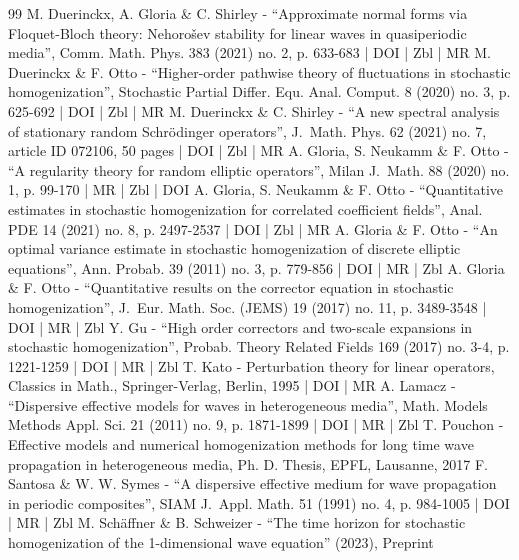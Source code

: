 \begin{thebibliography}{99}
M. Duerinckx, A. Gloria \& C. Shirley - “Approximate normal forms via Floquet-Bloch theory: Nehorošev stability for linear waves in quasiperiodic media”, Comm. Math. Phys. 383 (2021) no. 2, p. 633-683 | DOI | Zbl | MR
M. Duerinckx \& F. Otto - “Higher-order pathwise theory of fluctuations in stochastic homogenization”, Stochastic Partial Differ. Equ. Anal. Comput. 8 (2020) no. 3, p. 625-692 | DOI | Zbl | MR
M. Duerinckx \& C. Shirley - “A new spectral analysis of stationary random Schrödinger operators”, J. Math. Phys. 62 (2021) no. 7, article ID 072106, 50 pages | DOI | Zbl | MR
A. Gloria, S. Neukamm \& F. Otto - “A regularity theory for random elliptic operators”, Milan J. Math. 88 (2020) no. 1, p. 99-170 | MR | Zbl | DOI
A. Gloria, S. Neukamm \& F. Otto - “Quantitative estimates in stochastic homogenization for correlated coefficient fields”, Anal. PDE 14 (2021) no. 8, p. 2497-2537 | DOI | Zbl | MR
A. Gloria \& F. Otto - “An optimal variance estimate in stochastic homogenization of discrete elliptic equations”, Ann. Probab. 39 (2011) no. 3, p. 779-856 | DOI | MR | Zbl
A. Gloria \& F. Otto - “Quantitative results on the corrector equation in stochastic homogenization”, J. Eur. Math. Soc. (JEMS) 19 (2017) no. 11, p. 3489-3548 | DOI | MR | Zbl
Y. Gu - “High order correctors and two-scale expansions in stochastic homogenization”, Probab. Theory Related Fields 169 (2017) no. 3-4, p. 1221-1259 | DOI | MR | Zbl
T. Kato - Perturbation theory for linear operators, Classics in Math., Springer-Verlag, Berlin, 1995 | DOI | MR
A. Lamacz - “Dispersive effective models for waves in heterogeneous media”, Math. Models Methods Appl. Sci. 21 (2011) no. 9, p. 1871-1899 | DOI | MR | Zbl
T. Pouchon - Effective models and numerical homogenization methods for long time wave propagation in heterogeneous media, Ph. D. Thesis, EPFL, Lausanne, 2017
F. Santosa \& W. W. Symes - “A dispersive effective medium for wave propagation in periodic composites”, SIAM J. Appl. Math. 51 (1991) no. 4, p. 984-1005 | DOI | MR | Zbl
M. Schäffner \& B. Schweizer - “The time horizon for stochastic homogenization of the 1-dimensional wave equation” (2023), Preprint
\end{thebibliography}
